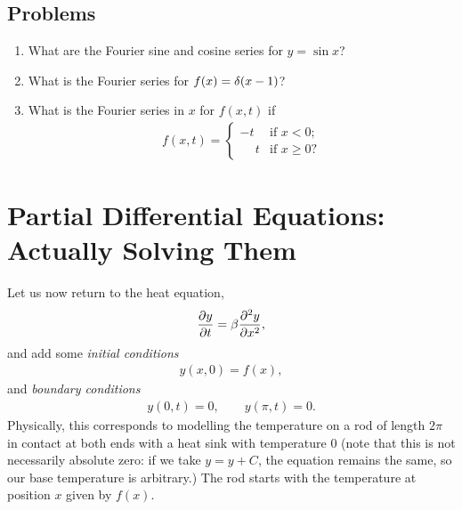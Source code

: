 \documentclass{book}
\begin{document}

\section{Problems}

\begin{enumerate}
  \item
    What are the Fourier sine and cosine series for
    $y=\sin x$?
  \item
    What is the Fourier series for $ f(x) = \delta(x-1)$?

  \item What is the Fourier series in $x$ for $f(x,t)$ if
    \begin{align}
    f(x,t) =
    \left\{ \begin{array}{ll}
      -t           & \mbox{if $x < 0$};\\
      \phantom{-}t & \mbox{if $x \geq 0$}?
    \end{array} \right.
    \end{align}

\end{enumerate}


\chapter{Partial Differential Equations:
         \\Actually Solving Them}

Let us now return to the heat equation,
\begin{align}
\label{heateq}
\frac{\partial y}{\partial t} = \beta \frac{\partial^2y}{\partial x^2},
\end{align}
and add some \emph{initial conditions}
\begin{align*}
y(x,0)=f(x),
\end{align*}
and \emph{boundary conditions}
\begin{align}
\label{homdibc}
y(0,t)=0, \qquad y(\pi,t)=0.
\end{align}
Physically, this corresponds to modelling the temperature on a rod of length
$2\pi$ in contact at both ends with a heat sink with temperature $0$ (note
that this is not necessarily absolute zero: if we take $y=y+C$, the equation
remains the same, so our base temperature is arbitrary.) The
rod starts with the temperature at position $x$ given by $f(x)$.
\end{document}
